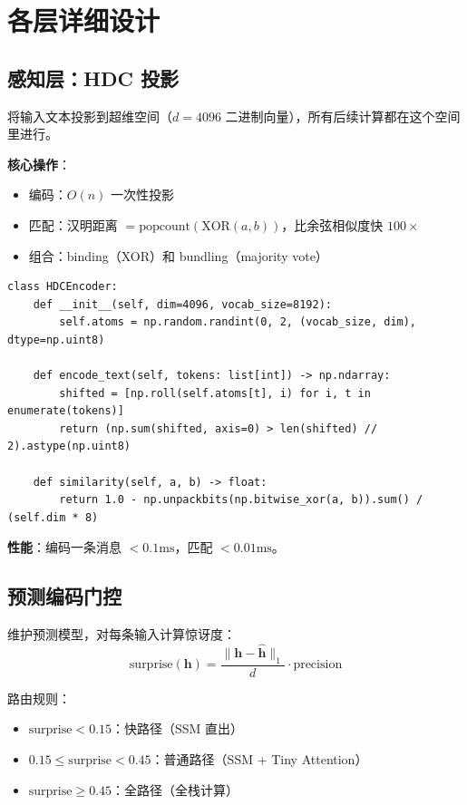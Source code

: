 \documentclass[11pt,a4paper]{article}
\begin{document}
\section{各层详细设计}

\subsection{感知层：HDC 投影}

将输入文本投影到超维空间（$d=4096$ 二进制向量），所有后续计算都在这个空间里进行。

\textbf{核心操作}：
\begin{itemize}[nosep]
  \item 编码：$O(n)$ 一次性投影
  \item 匹配：汉明距离 $= \text{popcount}(\text{XOR}(a, b))$，比余弦相似度快 $100\times$
  \item 组合：binding（XOR）和 bundling（majority vote）
\end{itemize}

\begin{lstlisting}
class HDCEncoder:
    def __init__(self, dim=4096, vocab_size=8192):
        self.atoms = np.random.randint(0, 2, (vocab_size, dim), dtype=np.uint8)

    def encode_text(self, tokens: list[int]) -> np.ndarray:
        shifted = [np.roll(self.atoms[t], i) for i, t in enumerate(tokens)]
        return (np.sum(shifted, axis=0) > len(shifted) // 2).astype(np.uint8)

    def similarity(self, a, b) -> float:
        return 1.0 - np.unpackbits(np.bitwise_xor(a, b)).sum() / (self.dim * 8)
\end{lstlisting}

\textbf{性能}：编码一条消息 $< 0.1\text{ms}$，匹配 $< 0.01\text{ms}$。

\subsection{预测编码门控}

维护预测模型，对每条输入计算惊讶度：
\[
\text{surprise}(\mathbf{h}) = \frac{\|\mathbf{h} - \hat{\mathbf{h}}\|_1}{d} \cdot \text{precision}
\]

路由规则：
\begin{itemize}[nosep]
  \item $\text{surprise} < 0.15$：快路径（SSM 直出）
  \item $0.15 \leq \text{surprise} < 0.45$：普通路径（SSM + Tiny Attention）
  \item $\text{surprise} \geq 0.45$：全路径（全栈计算）
\end{itemize}
\end{document}
